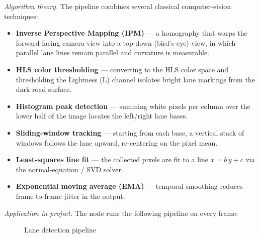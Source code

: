 \documentclass[12pt,a4paper]{article}
\begin{document}
\textit{Algorithm theory.}
The pipeline combines several classical computer-vision techniques:
\begin{itemize}
  \item \textbf{Inverse Perspective Mapping (IPM)} --- a homography that warps the
        forward-facing camera view into a top-down (bird's-eye) view, in which
        parallel lane lines remain parallel and curvature is measurable.
  \item \textbf{HLS color thresholding} --- converting to the HLS color space and
        thresholding the Lightness (L) channel isolates bright lane markings
        from the dark road surface.
  \item \textbf{Histogram peak detection} --- summing white pixels per column over
        the lower half of the image locates the left/right lane bases.
  \item \textbf{Sliding-window tracking} --- starting from each base, a vertical
        stack of windows follows the lane upward, re-centering on the pixel mean.
  \item \textbf{Least-squares line fit} --- the collected pixels are fit to a line
        $x = b\,y + c$ via the normal-equation / SVD solver.
  \item \textbf{Exponential moving average (EMA)} --- temporal smoothing reduces
        frame-to-frame jitter in the output.
\end{itemize}

\textit{Application in project.}
The node runs the following pipeline on every frame:

\begin{figure}[H]
\centering
{}
\caption{Lane detection pipeline}
\end{figure}
\end{document}
